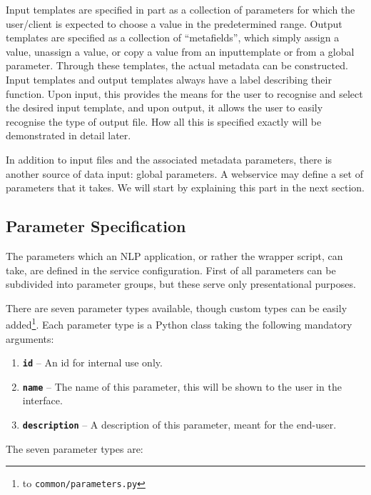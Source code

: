 \documentclass[a4paper,12pt]{report}
\begin{document}
Input templates are specified in part as a collection of parameters for which
the user/client is expected to choose a value in the predetermined range.
Output templates are specified as a collection of ``metafields'', which simply
assign a value, unassign a value, or copy a value from an inputtemplate or from
a global parameter. Through these templates, the actual metadata can be
constructed. Input templates and output templates always have a label
describing their function. Upon input, this provides the means for the user to
recognise and select the desired input template, and upon output, it allows the
user to easily recognise the type of output file. How all this is specified
exactly will be demonstrated in detail later.

In addition to input files and the associated metadata parameters, there is
another source of data input: global parameters. A webservice may define a set
of parameters that it takes. We will start by explaining this part in the next
section.


\subsection{Parameter Specification}
\label{sec:parameters}

The parameters which an NLP application, or rather the wrapper script, can
take, are defined in the service configuration. First of all parameters can be
subdivided into parameter groups, but these serve only presentational purposes. 

There are seven parameter types available, though custom types can be easily
added\footnote{to \texttt{common/parameters.py}}. Each parameter type is a
Python class taking the following mandatory arguments:

\begin{enumerate}
\item \textbf{\texttt{id}} -- An id for internal use only.
\item \textbf{\texttt{name}} -- The name of this parameter, this will be shown to the user in the interface.
\item \textbf{\texttt{description}} -- A description of this parameter, meant for the end-user.
\end{enumerate}

The seven parameter types are:
\end{document}
